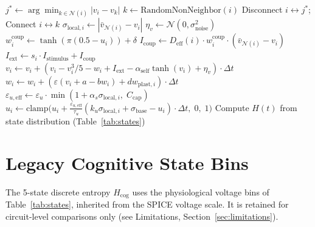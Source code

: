 ﻿\documentclass[11pt]{article}
\begin{document}
\begin{algorithm}[ht]
\caption{Time-step update for the doubt-modulated FHN network.}
\begin{algorithmic}[1]
    \STATE {}
        \STATE $j^* \leftarrow \arg\min_{k \in \mathcal{N}(i)} |v_i - v_k|$
        \STATE $k \leftarrow \text{RandomNonNeighbor}(i)$
        \STATE Disconnect $i \leftrightarrow j^*$; Connect $i \leftrightarrow k$
    \ENDFOR
        \STATE $\sigma_{\text{local},i} \leftarrow |\bar{v}_{\mathcal{N}(i)} - v_i|$
        \STATE $\eta_v \leftarrow \mathcal{N}(0, \sigma_{\text{noise}}^2)$
        \STATE $w_i^{\text{coup}} \leftarrow \tanh(\pi(0.5 - u_i)) + \delta$
        \STATE $I_{\text{coup}} \leftarrow D_{\text{eff}}(i) \cdot w_i^{\text{coup}} \cdot (\bar{v}_{\mathcal{N}(i)} - v_i)$
        \STATE $I_{\text{ext}} \leftarrow s_i \cdot I_{\text{stimulus}} + I_{\text{coup}}$ 
        \STATE $v_i \leftarrow v_i + (v_i - v_i^3/5 - w_i + I_{\text{ext}} - \alpha_{\text{self}} \tanh(v_i) + \eta_v) \cdot \Delta t$
        \STATE $w_i \leftarrow w_i + (\varepsilon(v_i + a - bw_i) + dw_{\text{plast},i}) \cdot \Delta t$
        \STATE $\varepsilon_{u,\text{eff}} \leftarrow \varepsilon_u \cdot \min(1 + \alpha_s \sigma_{\text{local},i},\; C_{\text{cap}})$
        \STATE $u_i \leftarrow \text{clamp}\!\bigl(u_i + \frac{\varepsilon_{u,\text{eff}}}{\tau_u}(k_u \sigma_{\text{local},i} + \sigma_{\text{base}} - u_i) \cdot \Delta t,\; 0,\; 1\bigr)$
    \ENDFOR
    \STATE Compute $H(t)$ from state distribution (Table~\ref{tab:states})
\ENDFOR
\end{algorithmic}
\end{algorithm}

\section{Legacy Cognitive State Bins}
\label{app:legacy_bins}

The 5-state discrete entropy $H_{\text{cog}}$ uses the physiological voltage bins of Table~\ref{tab:states}, inherited from the SPICE voltage scale. It is retained for circuit-level comparisons only (see Limitations, Section~\ref{sec:limitations}).
\end{document}
